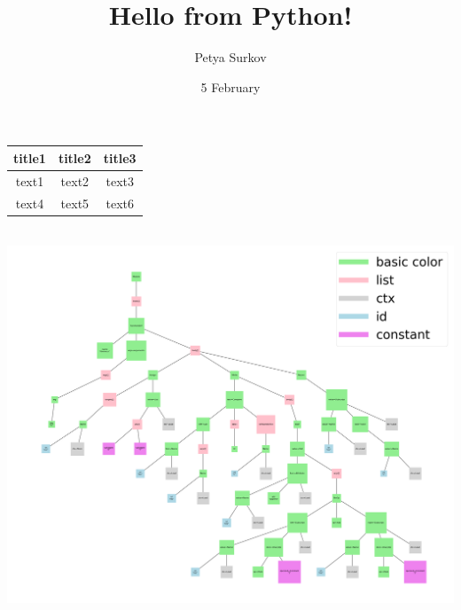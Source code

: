 \documentclass{article}
\title{Hello from Python!}
\author{Petya Surkov}
\date{5 February}
\begin{document}
\maketitle

\begin{tabular}{||c|c|c||}
\hline
title1 & title2 & title3 \\
\hline
text1 & text2 & text3 \\
\hline
text4 & text5 & text6 \\
\hline
\end{tabular}\\
\includegraphics[scale=0.22]{ast.png}
\end{document}
